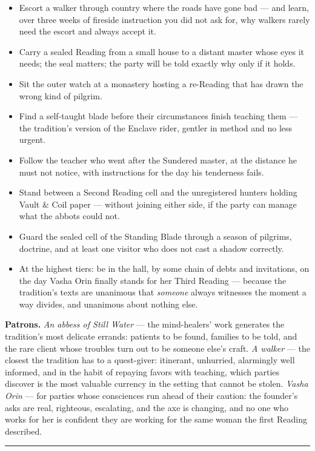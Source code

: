 \begin{itemize}
    \item Escort a walker through country where the roads have gone bad --- and learn, over three weeks of fireside instruction you did not ask for, why walkers rarely need the escort and always accept it.
    \item Carry a sealed Reading from a small house to a distant master whose eyes it needs; the seal matters; the party will be told exactly why only if it holds.
    \item Sit the outer watch at a monastery hosting a re-Reading that has drawn the wrong kind of pilgrim.
    \item Find a self-taught blade before their circumstances finish teaching them --- the tradition's version of the Enclave rider, gentler in method and no less urgent.
    \item Follow the teacher who went after the Sundered master, at the distance he must not notice, with instructions for the day his tenderness fails.
    \item Stand between a Second Reading cell and the unregistered hunters holding Vault \& Coil paper --- without joining either side, if the party can manage what the abbots could not.
    \item Guard the sealed cell of the Standing Blade through a season of pilgrims, doctrine, and at least one visitor who does not cast a shadow correctly.
    \item At the highest tiers: be in the hall, by some chain of debts and invitations, on the day Vasha Orin finally stands for her Third Reading --- because the tradition's texts are unanimous that \textit{someone} always witnesses the moment a way divides, and unanimous about nothing else.
\end{itemize}

\textbf{Patrons.} \textit{An abbess of Still Water} --- the mind-healers' work generates the tradition's most delicate errands: patients to be found, families to be told, and the rare client whose troubles turn out to be someone else's craft. \textit{A walker} --- the closest the tradition has to a quest-giver: itinerant, unhurried, alarmingly well informed, and in the habit of repaying favors with teaching, which parties discover is the most valuable currency in the setting that cannot be stolen. \textit{Vasha Orin} --- for parties whose consciences run ahead of their caution: the founder's asks are real, righteous, escalating, and the axe is changing, and no one who works for her is confident they are working for the same woman the first Reading described.

\medskip\hrule\medskip
